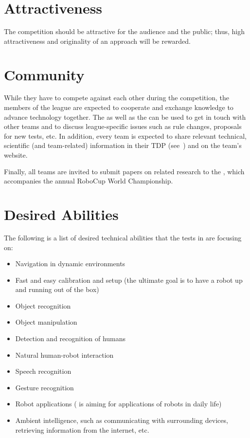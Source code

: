 \section{Attractiveness}
\label{concept:attractiveness}

The competition should be attractive for the audience and the public; thus, high attractiveness and originality of an approach will be rewarded.

\section{Community}
\label{concept:community}

While they have to compete against each other during the competition, the members of the \AtHome{} league are expected to cooperate and exchange knowledge to advance technology together.
The  as well as the \RR{} can be used to get in touch with other teams and to discuss league-specific issues such as rule changes, proposals for new tests, etc.
In addition, every team is expected to share relevant technical, scientific (and team-related) information in their TDP (see~) and on the team's website.

Finally, all teams are invited to submit papers on related research to the \Symp{}, which accompanies the annual RoboCup World Championship.

\section{Desired Abilities}
\label{concept:desired_abilities}

The following is a list of desired technical abilities that the tests in \AtHome{} are focusing on:

\begin{itemize}
    \item Navigation in dynamic environments
    \item Fast and easy calibration and setup (the ultimate goal is to have a robot up and running out of the box)
    \item Object recognition
    \item Object manipulation
    \item Detection and recognition of humans
    \item Natural human-robot interaction
    \item Speech recognition
    \item Gesture recognition
    \item Robot applications (\AtHome{} is aiming for applications of robots in daily life)
    \item Ambient intelligence, such as communicating with surrounding devices, retrieving information from the internet, etc.
\end{itemize}


